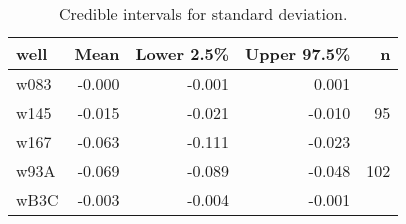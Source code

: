 \begin{table}[ht]
\centering
\begin{tabular}{lrrrr}
  \hline
well & Mean & Lower 2.5\% & Upper 97.5\% & n \\ 
  \hline
w083 & -0.000 & -0.001 & 0.001 &  \\ 
  w145 & -0.015 & -0.021 & -0.010 &   95 \\ 
  w167 & -0.063 & -0.111 & -0.023 &  \\ 
  w93A & -0.069 & -0.089 & -0.048 &  102 \\ 
  wB3C & -0.003 & -0.004 & -0.001 &  \\ 
   \hline
\end{tabular}
\caption{Credible intervals for standard deviation.} 
\label{tab:sd}
\end{table}
